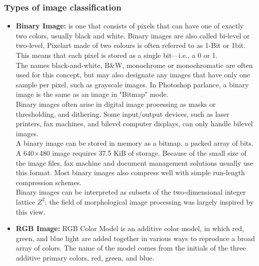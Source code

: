         \subsubsection{Types of image classification}
            \begin{itemize}
                \item \textbf{Binary Image:} is one that consists of pixels that can have one of exactly two colors, usually black and white. Binary images are also called bi-level 
                or two-level, Pixelart made of two colours is often referred to as 1-Bit or 1bit. This means that each pixel is stored as a single bit—i.e., a 0 or 1. \\
                \vspace{2mm}
                The names black-and-white, B\&W, monochrome or monochromatic are often used for this concept, but may also designate any images that have only one sample per pixel, 
                such as grayscale images. In Photoshop parlance, a binary image is the same as an image in "Bitmap" mode. \\ 
                \vspace{2mm}
                Binary images often arise in digital image processing as masks or thresholding, and dithering. Some input/output devices, such as laser printers, fax machines, 
                and bilevel computer displays, can only handle bilevel images. \\ 
                \vspace{2mm}
                A binary image can be stored in memory as a bitmap, a packed array of bits. A 640×480 image requires 37.5 KiB of storage. Because of the small size of the image files, 
                fax machine and document management solutions usually use this format. Most binary images also compress well with simple run-length compression schemes. \\ 
                \vspace{2mm}
                Binary images can be interpreted as subsets of the two-dimensional integer lattice $Z^2$; the field of morphological image processing was largely inspired by this view.
                \item \textbf{RGB Image:} RGB Color Model is an additive color model, in which red, green, and blue light are added together in various ways to reproduce a broad array 
                of colors. The name of the model comes from the initials of the three additive primary colors, red, green, and blue. \\ 

\end{itemize}
